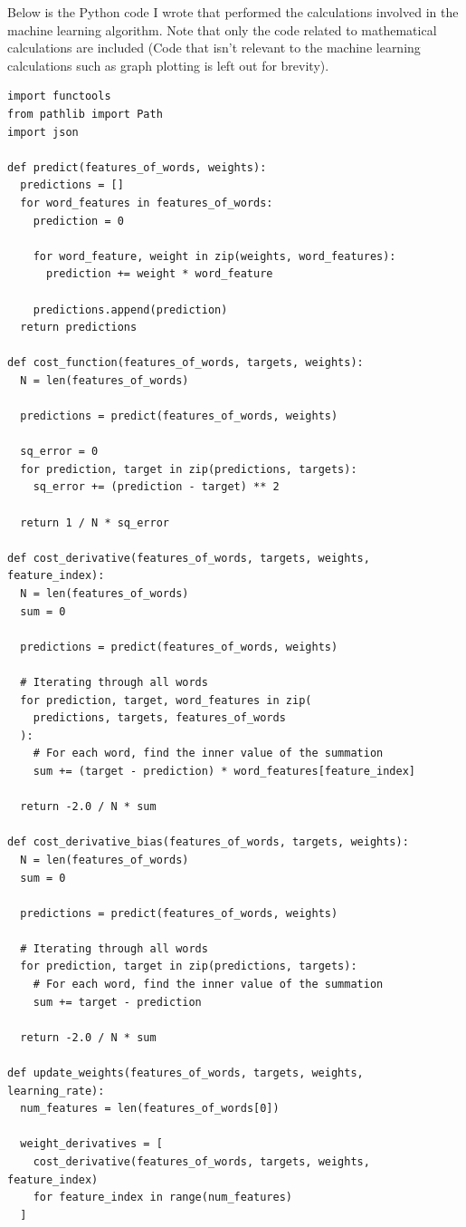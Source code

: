 \documentclass[12pt]{article}
\begin{document}
Below is the Python code I wrote that performed the calculations involved in the machine learning algorithm. Note that only the code related to mathematical calculations are included (Code that isn't relevant to the machine learning calculations such as graph plotting is left out for brevity).
\begin{verbatim}
import functools
from pathlib import Path
import json

def predict(features_of_words, weights):
  predictions = []
  for word_features in features_of_words:
    prediction = 0

    for word_feature, weight in zip(weights, word_features):
      prediction += weight * word_feature

    predictions.append(prediction)
  return predictions

def cost_function(features_of_words, targets, weights):
  N = len(features_of_words)

  predictions = predict(features_of_words, weights)

  sq_error = 0
  for prediction, target in zip(predictions, targets):
    sq_error += (prediction - target) ** 2

  return 1 / N * sq_error

def cost_derivative(features_of_words, targets, weights, feature_index):
  N = len(features_of_words)
  sum = 0

  predictions = predict(features_of_words, weights)

  # Iterating through all words
  for prediction, target, word_features in zip(
    predictions, targets, features_of_words
  ):
    # For each word, find the inner value of the summation
    sum += (target - prediction) * word_features[feature_index]

  return -2.0 / N * sum

def cost_derivative_bias(features_of_words, targets, weights):
  N = len(features_of_words)
  sum = 0

  predictions = predict(features_of_words, weights)

  # Iterating through all words
  for prediction, target in zip(predictions, targets):
    # For each word, find the inner value of the summation
    sum += target - prediction

  return -2.0 / N * sum

def update_weights(features_of_words, targets, weights, learning_rate):
  num_features = len(features_of_words[0])

  weight_derivatives = [
    cost_derivative(features_of_words, targets, weights, feature_index)
    for feature_index in range(num_features)
  ]


\end{verbatim}
\end{document}
